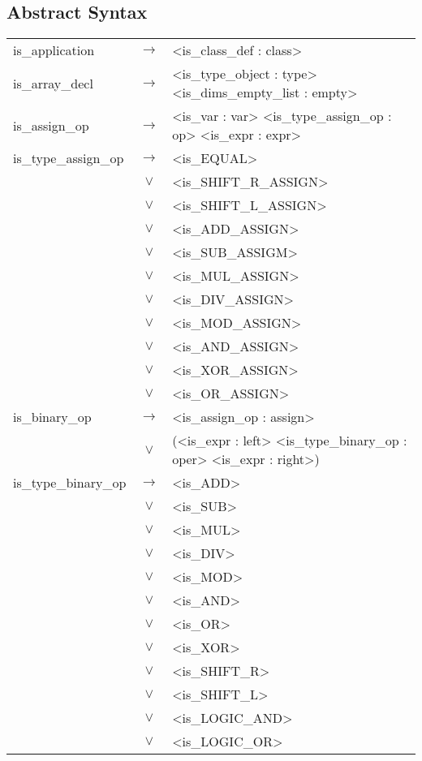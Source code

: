 \documentclass[a4paper]{article}
\begin{document}
\subsection{Abstract Syntax}
\begin{longtable}{lcl}
	is\_application				& $\to$ & <is\_class\_def : class> \\
	is\_array\_decl 			& $\to$ & <is\_type\_object : type> <is\_dims\_empty\_list : empty> \\
	is\_assign\_op				& $\to$ & <is\_var : var> <is\_type\_assign\_op : op> <is\_expr : expr> \\
	is\_type\_assign\_op		& $\to$ & <is\_EQUAL> \\
								& $\vee$ & <is\_SHIFT\_R\_ASSIGN> \\
								& $\vee$ & <is\_SHIFT\_L\_ASSIGN> \\
								& $\vee$ & <is\_ADD\_ASSIGN> \\
								& $\vee$ & <is\_SUB\_ASSIGM> \\
								& $\vee$ & <is\_MUL\_ASSIGN> \\
								& $\vee$ & <is\_DIV\_ASSIGN> \\
								& $\vee$ & <is\_MOD\_ASSIGN> \\
								& $\vee$ & <is\_AND\_ASSIGN> \\
								& $\vee$ & <is\_XOR\_ASSIGN> \\
								& $\vee$ & <is\_OR\_ASSIGN> \\
	is\_binary\_op				& $\to$ & <is\_assign\_op : assign> \\
								& $\vee$ & (<is\_expr : left> <is\_type\_binary\_op : oper> <is\_expr : right>) \\
	is\_type\_binary\_op		& $\to$ & <is\_ADD> \\
								& $\vee$ & <is\_SUB> \\
								& $\vee$ & <is\_MUL> \\
								& $\vee$ & <is\_DIV> \\
								& $\vee$ & <is\_MOD> \\
								& $\vee$ & <is\_AND> \\
								& $\vee$ & <is\_OR> \\
								& $\vee$ & <is\_XOR> \\
								& $\vee$ & <is\_SHIFT\_R>\\
								& $\vee$ & <is\_SHIFT\_L> \\
								& $\vee$ & <is\_LOGIC\_AND>\\
								& $\vee$ & <is\_LOGIC\_OR> \\

\end{longtable}
\end{document}
